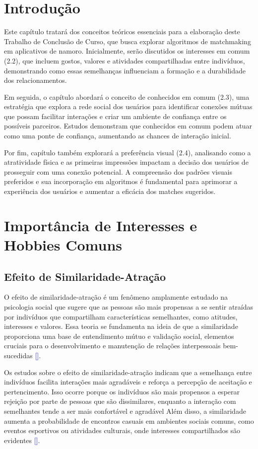 
\section{Introdução}
Este capítulo tratará dos conceitos teóricos essenciais para a elaboração deste Trabalho de Conclusão de Curso, que busca explorar algoritmos de matchmaking em aplicativos de namoro. Inicialmente, serão discutidos os interesses em comum (2.2), que incluem gostos, valores e atividades compartilhadas entre indivíduos, demonstrando como essas semelhanças influenciam a formação e a durabilidade dos relacionamentos.

Em seguida, o capítulo abordará o conceito de conhecidos em comum (2.3), uma estratégia que explora a rede social dos usuários para identificar conexões mútuas que possam facilitar interações e criar um ambiente de confiança entre os possíveis parceiros. Estudos demonstram que conhecidos em comum podem atuar como uma ponte de confiança, aumentando as chances de interação inicial.

Por fim, capítulo também explorará a preferência visual (2.4), analisando como a atratividade física e as primeiras impressões impactam a decisão dos usuários de prosseguir com uma conexão potencial. A compreensão dos padrões visuais preferidos e sua incorporação em algoritmos é fundamental para aprimorar a experiência dos usuários e aumentar a eficácia dos matches sugeridos.


\section{Importância de Interesses e Hobbies Comuns}
\subsection{Efeito de Similaridade-Atração}
O efeito de similaridade-atração é um fenômeno amplamente estudado na psicologia social que sugere que as pessoas são mais propensas a se sentir atraídas por indivíduos que compartilham características semelhantes, como atitudes, interesses e valores. Essa teoria se fundamenta na ideia de que a similaridade proporciona uma base de entendimento mútuo e validação social, elementos cruciais para o desenvolvimento e manutenção de relações interpessoais bem-sucedidas \textcolor{blue}{[\cite{Berscheid1998}]}.

Os estudos sobre o efeito de similaridade-atração indicam que a semelhança entre indivíduos facilita interações mais agradáveis e reforça a percepção de aceitação e pertencimento. Isso ocorre porque os indivíduos são mais propensos a esperar rejeição por parte de pessoas que são dissimilares, enquanto a interação com semelhantes tende a ser mais confortável e agradável Além disso, a similaridade aumenta a probabilidade de encontros casuais em ambientes sociais comuns, como eventos esportivos ou atividades culturais, onde interesses compartilhados são evidentes \textcolor{blue}{[\cite{Newcomb1961}]}.

